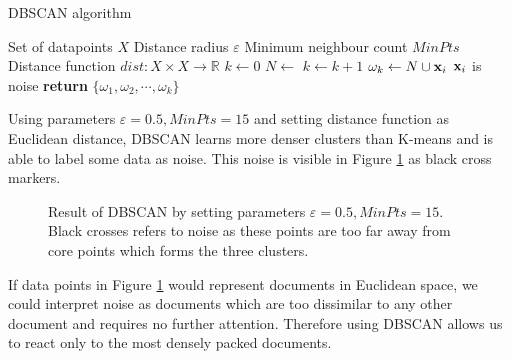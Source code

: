 \begin{algorithm}[ht]
\caption{DBSCAN algorithm \cite{Ester:1996:DAD:3001460.3001507, Schubert:2017:DRR:3129336.3068335}}
\label{alg-dbscan}
\begin{algorithmic}

\Require Set of datapoints $X$
\Require Distance radius $\varepsilon$
\Require Minimum neighbour count $MinPts$
\Require Distance function $dist: X \times X \rightarrow \mathbb{R}$
   \State $k \gets 0$
    \State $N \gets $ 
        \State $k \gets k + 1$
        \State $\omega_k \gets N \cup \mathbf{x}_i$
    \Else
        \State $\mathbf{x}_i$ is noise
    \EndIf
   \EndFor
   \State \textbf{return} $\{\omega_1, \omega_2, \cdots, \omega_k\}$
\EndProcedure

\end{algorithmic}
\end{algorithm}


Using parameters $\varepsilon = 0.5, MinPts = 15$ and setting distance function as Euclidean distance, DBSCAN learns more denser clusters than K-means and is able to label some data as noise. This noise is visible in Figure \ref{fig-dbscan-example} as black cross markers. 

\begin{figure}[ht]
\centering
\setlength\figureheight{7cm}
\setlength\figurewidth{7cm}

\caption{Result of DBSCAN by setting parameters $\varepsilon = 0.5, MinPts = 15$. Black crosses refers to noise as these points are too far away from core points which forms the three clusters.} \label{fig-dbscan-example}
\end{figure}

\newpage

\noindent
If data points in Figure \ref{fig-dbscan-example} would represent documents in Euclidean space, we could interpret noise as documents which are too dissimilar to any other document and requires no further attention. Therefore using DBSCAN allows us to react only to the most densely packed documents. 